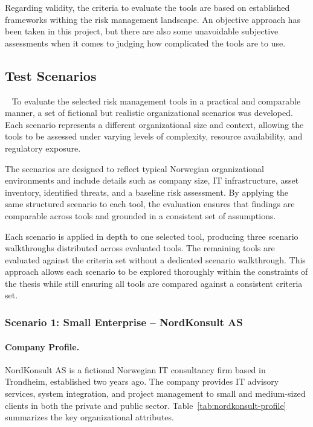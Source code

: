 Regarding validity, the criteria to evaluate the tools are based on established frameworks withing the risk management landscape. An objective approach has been taken in this project, but there are also some unavoidable subjective assessments when it comes to judging how complicated the tools are to use.

\subsection{Test Scenarios}
~\label{sec:test-scenarios}
To evaluate the selected risk management tools in a practical and comparable manner, a set of fictional but realistic organizational scenarios was developed. Each scenario represents a different organizational size and context, allowing the tools to be assessed under varying levels of complexity, resource availability, and regulatory exposure.
 
The scenarios are designed to reflect typical Norwegian organizational environments and include details such as company size, IT infrastructure, asset inventory, identified threats, and a baseline risk assessment. By applying the same structured scenario to each tool, the evaluation ensures that findings are comparable across tools and grounded in a consistent set of assumptions.

Each scenario is applied in depth to one selected tool, producing three scenario walkthroughs distributed across evaluated tools. The remaining tools are evaluated against the criteria set without a dedicated scenario walkthrough. This approach allows each scenario to be explored thoroughly within the constraints of the thesis while still ensuring all tools are compared against a consistent criteria set.
 
 
\subsubsection{Scenario 1: Small Enterprise -- NordKonsult AS}
\label{sec:scenario-small}
 
\paragraph{Company Profile.}
NordKonsult AS is a fictional Norwegian IT consultancy firm based in Trondheim, established two years ago. The company provides IT advisory services, system integration, and project management to small and medium-sized clients in both the private and public sector. Table~\ref{tab:nordkonsult-profile} summarizes the key organizational attributes.
 
